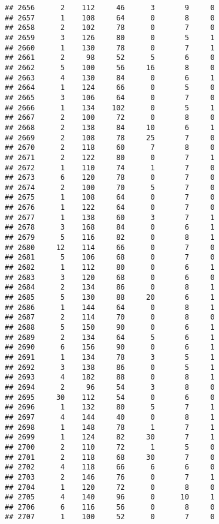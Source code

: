 \documentclass[
]{article}
\begin{document}
\begin{verbatim}
## 2656      2    112     46      3       9     0
## 2657      1    108     64      0       8     0
## 2658      2    102     78      0       7     0
## 2659      3    126     80      0       5     1
## 2660      1    130     78      0       7     1
## 2661      2     98     52      5       6     0
## 2662      5    100     56     16       8     0
## 2663      4    130     84      0       6     1
## 2664      1    124     66      0       5     0
## 2665      3    106     64      0       7     0
## 2666      1    134    102      0       5     1
## 2667      2    100     72      0       8     0
## 2668      2    138     84     10       6     1
## 2669      2    108     78     25       7     0
## 2670      2    118     60      7       8     0
## 2671      2    122     80      0       7     1
## 2672      1    110     74      1       7     0
## 2673      6    120     78      0       7     0
## 2674      2    100     70      5       7     0
## 2675      1    108     64      0       7     0
## 2676      1    122     64      0       7     0
## 2677      1    138     60      3       7     1
## 2678      3    168     84      0       6     1
## 2679      5    116     82      0       8     1
## 2680     12    114     66      0       7     0
## 2681      5    106     68      0       7     0
## 2682      1    112     80      0       6     1
## 2683      3    120     68      0       6     0
## 2684      2    134     86      0       8     1
## 2685      5    130     88     20       6     1
## 2686      1    144     64      0       8     1
## 2687      2    114     70      0       8     0
## 2688      5    150     90      0       6     1
## 2689      2    134     64      5       6     1
## 2690      6    156     90      0       6     1
## 2691      1    134     78      3       5     1
## 2692      3    138     86      0       5     1
## 2693      4    182     88      0       8     1
## 2694      2     96     54      3       8     0
## 2695     30    112     54      0       6     0
## 2696      1    132     80      5       7     1
## 2697      4    144     40      0       8     1
## 2698      1    148     78      1       7     1
## 2699      1    124     82     30       7     1
## 2700      2    110     72      1       5     0
## 2701      2    118     68     30       7     0
## 2702      4    118     66      6       6     0
## 2703      2    146     76      0       7     1
## 2704      1    120     72      0       8     0
## 2705      4    140     96      0      10     1
## 2706      6    116     56      0       8     0
## 2707      1    100     52      0       7     0

\end{verbatim}
\end{document}

